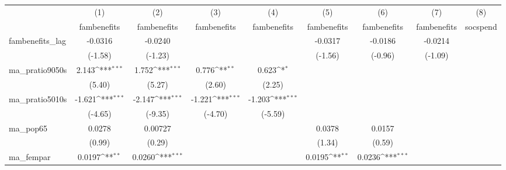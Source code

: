 {
\def\sym#1{\ifmmode^{#1}\else\(^{#1}\)\fi}
\begin{tabular}{l*{8}{c}}
\hline\hline
            &\multicolumn{1}{c}{(1)}&\multicolumn{1}{c}{(2)}&\multicolumn{1}{c}{(3)}&\multicolumn{1}{c}{(4)}&\multicolumn{1}{c}{(5)}&\multicolumn{1}{c}{(6)}&\multicolumn{1}{c}{(7)}&\multicolumn{1}{c}{(8)}\\
            &\multicolumn{1}{c}{fambenefits}&\multicolumn{1}{c}{fambenefits}&\multicolumn{1}{c}{fambenefits}&\multicolumn{1}{c}{fambenefits}&\multicolumn{1}{c}{fambenefits}&\multicolumn{1}{c}{fambenefits}&\multicolumn{1}{c}{fambenefits}&\multicolumn{1}{c}{socspend}\\
\hline
fambenefits\_lag&     -0.0316         &     -0.0240         &                     &                     &     -0.0317         &     -0.0186         &     -0.0214         &                     \\
            &     (-1.58)         &     (-1.23)         &                     &                     &     (-1.56)         &     (-0.96)         &     (-1.09)         &                     \\
[1em]
ma\_pratio9050s&       2.143\sym{***}&       1.752\sym{***}&       0.776\sym{**} &       0.623\sym{*}  &                     &                     &                     &                     \\
            &      (5.40)         &      (5.27)         &      (2.60)         &      (2.25)         &                     &                     &                     &                     \\
[1em]
ma\_pratio5010s&      -1.621\sym{***}&      -2.147\sym{***}&      -1.221\sym{***}&      -1.203\sym{***}&                     &                     &                     &                     \\
            &     (-4.65)         &     (-9.35)         &     (-4.70)         &     (-5.59)         &                     &                     &                     &                     \\
[1em]
ma\_pop65    &      0.0278         &     0.00727         &                     &                     &      0.0378         &      0.0157         &                     &                     \\
            &      (0.99)         &      (0.29)         &                     &                     &      (1.34)         &      (0.59)         &                     &                     \\
[1em]
ma\_fempar   &      0.0197\sym{**} &      0.0260\sym{***}&                     &                     &      0.0195\sym{**} &      0.0236\sym{***}&                     &                     \\

\end{tabular}}
